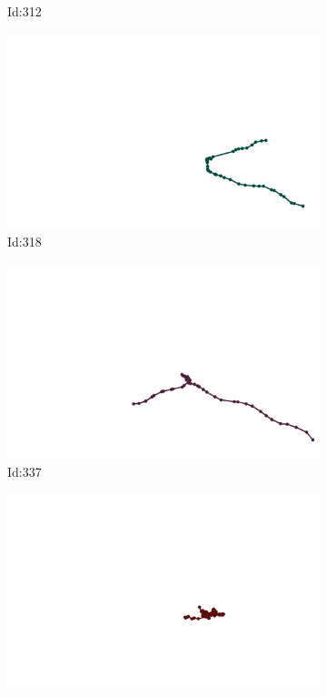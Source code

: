 \documentclass[12pt,twoside]{report}
\begin{document}
\begin{figure}
\begin{subfigure}[b]{0.20\textwidth}
\caption{Id:312}
\end{subfigure}
\begin{subfigure}[b]{0.20\textwidth}
\centering
\includegraphics[width=\textwidth]{../trajectories/318.png}
\caption{Id:318}
\end{subfigure}
\begin{subfigure}[b]{0.20\textwidth}
\centering
\includegraphics[width=\textwidth]{../trajectories/337.png}
\caption{Id:337}
\end{subfigure}
\begin{subfigure}[b]{0.20\textwidth}
\centering
\includegraphics[width=\textwidth]{../trajectories/369.png}

\end{subfigure}
\end{figure}
\end{document}
